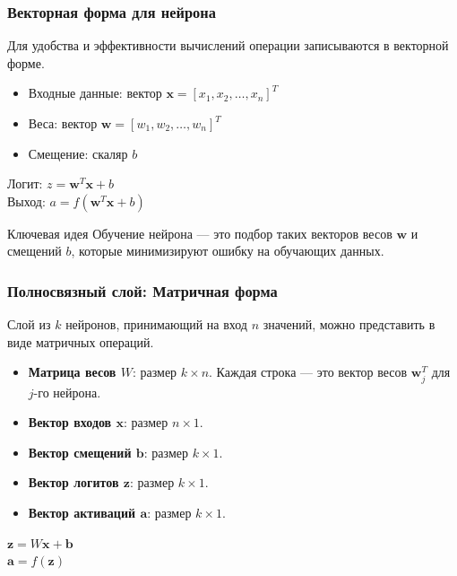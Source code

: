 \documentclass[notheorems, handout]{beamer}
\begin{document}
\begin{frame}
    \frametitle{Векторная форма для нейрона}
    Для удобства и эффективности вычислений операции записываются в векторной форме.
    \begin{itemize}
        \item Входные данные: вектор $\mathbf{x} = [x_1, x_2, \dots, x_n]^T$
        \item Веса: вектор $\mathbf{w} = [w_1, w_2, \dots, w_n]^T$
        \item Смещение: скаляр $b$
    \end{itemize}
    \pause
    \begin{block}
    \centering
    Логит: $z = \mathbf{w}^T \mathbf{x} + b$ \\
    Выход: $a = f(\mathbf{w}^T \mathbf{x} + b)$
    \end{block}
    \vfill
    \begin{block}{Ключевая идея}
    Обучение нейрона --- это подбор таких векторов весов $\mathbf{w}$ и смещений $b$, которые минимизируют ошибку на обучающих данных.
    \end{block}
\end{frame}

\begin{frame}
    \frametitle{Полносвязный слой: Матричная форма}
    Слой из $k$ нейронов, принимающий на вход $n$ значений, можно представить в виде матричных операций.
    \begin{itemize}
        \item \textbf{Матрица весов $W$}: размер $k \times n$. Каждая строка --- это вектор весов $\mathbf{w}_j^T$ для $j$-го нейрона.
        \item \textbf{Вектор входов $\mathbf{x}$}: размер $n \times 1$.
        \item \textbf{Вектор смещений $\mathbf{b}$}: размер $k \times 1$.
        \item \textbf{Вектор логитов $\mathbf{z}$}: размер $k \times 1$.
        \item \textbf{Вектор активаций $\mathbf{a}$}: размер $k \times 1$.
    \end{itemize}
    \pause
    \begin{block}
    \centering
    $\mathbf{z} = W \mathbf{x} + \mathbf{b}$ \\
    $\mathbf{a} = f(\mathbf{z})$
    \end{block}
\end{frame}
\end{document}
